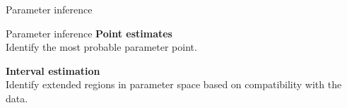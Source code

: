 \documentclass[
aspectratio=169,
14pt,
professionalfonts
]{beamer}
\begin{document}




\begin{frame}
\center
\Large
Parameter inference
\end{frame}

\begin{frame}{Parameter inference}
    \center
    \textbf{Point estimates}\\
    Identify the most probable parameter point.

    \vspace{1cm}

    \textbf{Interval estimation}\\
    Identify extended regions in parameter space based on compatibility with the data.
\end{frame}
\end{document}
